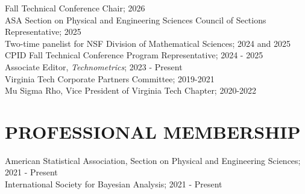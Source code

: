 \documentclass[margin,line,11pt]{res}
\begin{document}
\begin{resume}
Fall Technical Conference Chair; 2026 \\
ASA Section on Physical and Engineering Sciences Council of Sections Representative; 2025 \\
Two-time panelist for NSF Division of Mathematical Sciences; 2024 and 2025 \\
CPID Fall Technical Conference Program Representative; 2024 - 2025 \\
Associate Editor, {\it Technometrics}; 2023 - Present \\
Virginia Tech Corporate Partners Committee; 2019-2021 \\
Mu Sigma Rho, Vice President of Virginia Tech Chapter; 2020-2022

\medskip
\section{\bf PROFESSIONAL MEMBERSHIP}

American Statistical Association, Section on Physical and Engineering Sciences; 2021 - Present \\
International Society for Bayesian Analysis; 2021 - Present \\

\end{resume}
\end{document}
